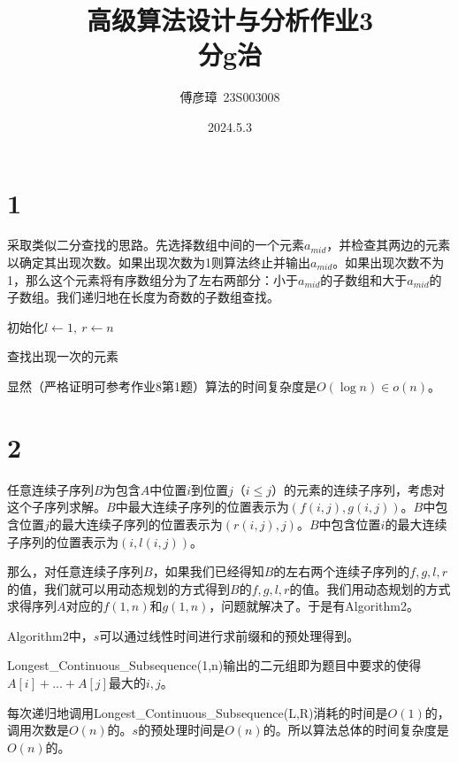 \documentclass{ctexart}
\title{高级算法设计与分析作业3\\分g治}
\author{傅彦璋\ 23S003008}
\date{2024.5.3}
\begin{document}
\maketitle



\section*{1}
采取类似二分查找的思路。先选择数组中间的一个元素$a_{mid}$，并检查其两边的元素以确定其出现次数。如果出现次数为1则算法终止并输出$a_{mid}$。如果出现次数不为1，那么这个元素将有序数组分为了左右两部分：小于$a_{mid}$的子数组和大于$a_{mid}$的子数组。我们递归地在长度为奇数的子数组查找。


\begin{algorithm}[H]
  \SetAlgoLined

  初始化$l \leftarrow 1,\ r\leftarrow n $\;
  \caption{查找出现一次的元素}
\end{algorithm}

显然（严格证明可参考作业8第1题）算法的时间复杂度是$O(\log n)\in o(n)$。

\section*{2}
任意连续子序列$B$为包含$A$中位置$i$到位置$j$（$i\le j$）的元素的连续子序列，考虑对这个子序列求解。$B$中最大连续子序列的位置表示为$(f(i,j),g(i,j))$。$B$中包含位置$j$的最大连续子序列的位置表示为$(r(i,j),j)$。$B$中包含位置$i$的最大连续子序列的位置表示为$(i,l(i,j))$。

那么，对任意连续子序列$B$，如果我们已经得知$B$的左右两个连续子序列的$f,g,l,r$的值，我们就可以用动态规划的方式得到$B$的$f,g,l,r$的值。我们用动态规划的方式求得序列$A$对应的$f(1,n)$和$g(1,n)$，问题就解决了。于是有Algorithm2。

Algorithm2中，$s$可以通过线性时间进行求前缀和的预处理得到。

Longest\_Continuous\_Subsequence(1,n)输出的二元组即为题目中要求的使得$A[i]+...+A[j]$最大的$i,j$。

每次递归地调用Longest\_Continuous\_Subsequence(L,R)消耗的时间是$O(1)$的，调用次数是$O(n)$的。$s$的预处理时间是$O(n)$的。所以算法总体的时间复杂度是$O(n)$的。
\end{document}
